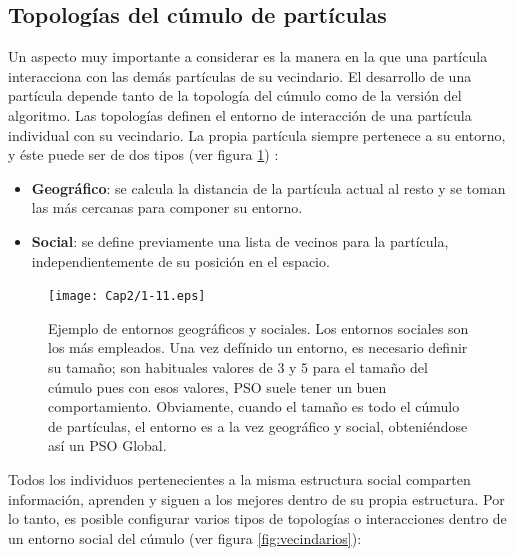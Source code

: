     \subsection{Topolog\'ias del c\'umulo de part\'iculas}
   
   Un aspecto muy importante a considerar es la manera en la que una part\'icula interacciona con las dem\'as part\'iculas de su 
   vecindario. 
   El desarrollo de una part\'icula depende tanto de la topolog\'ia del c\'umulo como de la versi\'on del algoritmo. Las topolog\'ias definen 
   el entorno de interacci\'on de una part\'icula individual con su vecindario. La propia part\'icula siempre pertenece a su entorno, y \'este
   puede ser de dos tipos (ver figura \ref{fig:entornos}) \cite{JKennedySI}:
   
   \begin{itemize}
    \item \textbf{Geogr\'afico}: se calcula la distancia de la part\'icula actual al resto y se toman las m\'as cercanas para componer su entorno.
    \item \textbf{Social}: se define previamente una lista de vecinos para la part\'icula, independientemente de su posici\'on en el espacio.
   \end{itemize}
  
  \begin{figure}
	\centering
	\texttt{[image: Cap2/1-11.eps]}
	  \caption[Ejemplo de entornos geogr\'aficos y sociales]{Ejemplo de entornos geogr\'aficos y sociales. Los entornos sociales son los 
	  m\'as empleados. Una vez def\'inido un entorno, es necesario definir su tama\~no; son habituales valores de $3$ y $5$ 
	  para el tama\~no del c\'umulo pues con esos valores, PSO suele tener un buen comportamiento. Obviamente, cuando el tama\~no es 
	  todo el c\'umulo de part\'iculas, el entorno es a la vez geogr\'afico y social, obteni\'endose 
	  as\'i un PSO Global.}
      \label{fig:entornos}
      \end{figure}
  
  Todos los individuos pertenecientes a la misma estructura social comparten informaci\'on, aprenden y siguen a los mejores dentro de 
  su propia estructura. Por lo tanto, es posible configurar varios tipos de topolog\'ias o interacciones dentro de un entorno social 
  del c\'umulo (ver figura \ref{fig:vecindarios}):

